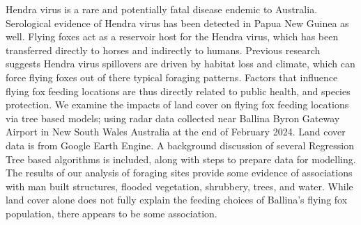 \begin{doublespace}
Hendra virus is a rare and potentially fatal disease endemic to Australia.
Serological evidence of Hendra virus has been detected in Papua New Guinea as well.
Flying foxes
act as a reservoir host for the Hendra virus, which has been transferred directly to
horses and indirectly to humans. Previous research suggests Hendra virus spillovers are
driven by habitat loss and climate, which can force flying foxes out of there typical
foraging patterns. Factors that influence flying fox feeding locations are thus directly 
related to public health, and species protection. We examine the impacts of land cover on 
flying fox feeding locations via tree based models; using radar data collected near Ballina 
Byron Gateway Airport in New South Wales Australia at the end of February 2024. Land 
cover data is from Google Earth Engine. A background discussion of several
Regression Tree based algorithms is included,
along with steps to prepare data for modelling. The results of our analysis of
foraging sites provide some evidence of associations with man built structures,
flooded vegetation, shrubbery, trees, and water. While land cover alone does not fully
explain the feeding choices of Ballina's flying fox population, there appears to be
some association.
\end{doublespace}